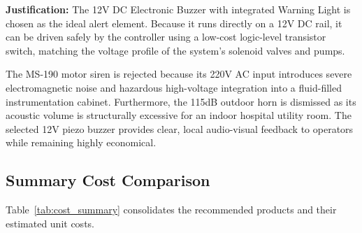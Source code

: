 \documentclass[12pt,a4paper]{article}
\begin{document}
\noindent\textbf{Justification:} The 12V DC Electronic Buzzer with integrated Warning Light is chosen as the ideal alert element. Because it runs directly on a 12V DC rail, it can be driven safely by the controller using a low-cost logic-level transistor switch, matching the voltage profile of the system's solenoid valves and pumps. 

The MS-190 motor siren is rejected because its 220V AC input introduces severe electromagnetic noise and hazardous high-voltage integration into a fluid-filled instrumentation cabinet. Furthermore, the 115dB outdoor horn is dismissed as its acoustic volume is structurally excessive for an indoor hospital utility room. The selected 12V piezo buzzer provides clear, local audio-visual feedback to operators while remaining highly economical.
\subsection{Summary Cost Comparison}

Table~\ref{tab:cost_summary} consolidates the recommended products and their estimated unit costs.
\end{document}
